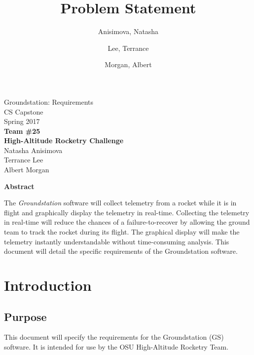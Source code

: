 \documentclass[10pt,journal,draftclsnofoot,onecolumn]{IEEEtran}
\begin{document}
	\singlespace
	
	\title{\vspace{2in}Problem Statement}
	
	\author {
		Anisimova, Natasha
		\and
		Lee, Terrance
		\and
		Morgan, Albert
	}
	
	
	\pagestyle{empty}
	\vspace*{2in}
	\begin{center}
		\huge
		Groundstation: Requirements\\
		\normalsize
		\vspace{5mm}
		CS Capstone\\
		Spring 2017\\
		\vspace{5mm}
		\textbf{
			Team \#25\\
			High-Altitude Rocketry Challenge\\
		}
		\vspace{1mm}
		Natasha Anisimova\\
		Terrance Lee\\
		Albert Morgan
	\end{center}
	
	\vspace{5mm}
	
	\begin{center}
		\textbf{Abstract}
	\end{center}
	
	
	The \textit{Groundstation} software will collect telemetry from a rocket while it is in flight and graphically display the telemetry in real-time.
	Collecting the telemetry in real-time will reduce the chances of a failure-to-recover by allowing the ground team to track the rocket during its flight.
	The graphical display will make the telemetry instantly understandable without time-consuming analysis.
	This document will detail the specific requirements of the Groundstation software.

	
	
	\newpage
	\pagestyle{headings}


	\section{Introduction}
	
	\subsection{Purpose}
	This document will specify the requirements for the Groundstation (GS) software.
	It is intended for use by the OSU High-Altitude Rocketry Team.
	
\end{document}
